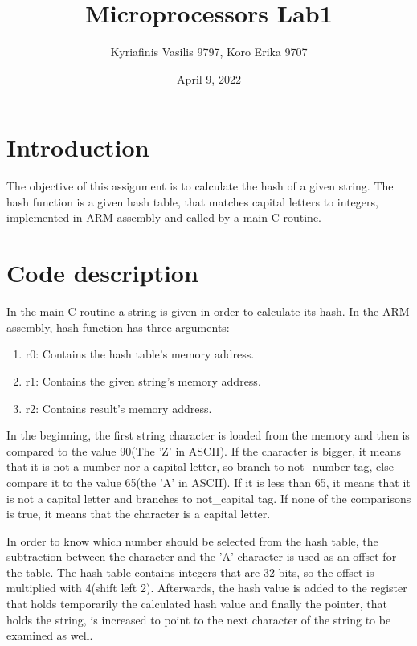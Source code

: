 \documentclass[a4paper, 12pt]{report}
\title{\Large{\textbf{Microprocessors Lab1}}}
\author{Kyriafinis Vasilis 9797, Koro Erika 9707}
\date{April 9, 2022}
\begin{document}
    \maketitle
    
    \section*{Introduction}
    The objective of this assignment is to calculate the hash of a given string.
    The hash function is a given hash table, that matches capital letters to integers, implemented in ARM
    assembly and called by a main C routine. 

    \section*{Code description}
    In the main C routine a string is given in order to calculate its hash. 
    In the ARM assembly, hash function has three arguments: 

    \begin{enumerate}
        \item r0: Contains the hash table's memory address.
        \item r1: Contains the given string's memory address.
        \item r2: Contains result's memory address.
    \end{enumerate}

    In the beginning, the first string character is loaded from the memory and then is compared to the value
    90(The 'Z' in ASCII). If the character is bigger, it means that it is not a number nor a capital
    letter, so branch to not\_number tag, else compare it to the value 65(the 'A' in ASCII). If it is less than
    65, it means that it is not a capital letter and branches to not\_capital tag. If none of the comparisons is
    true, it means that the character is a capital letter.
    
    In order to know which number should be selected from 
    the hash table, the subtraction between the character and the 'A' character is used as an offset for the
    table. The hash table contains integers that are 32 bits, so the offset is multiplied with 4(shift left 2).
    Afterwards, the hash value is added to the register that holds temporarily the calculated hash value and finally
    the pointer, that holds the string, is increased to point to the next character of the string 
    to be examined as well. 
\end{document}
